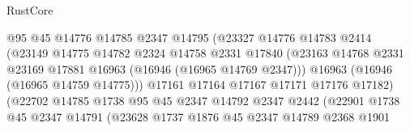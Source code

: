 \begin{lexlean}{RustCore}
\begin{coremodule}
                                      @95
                                      @45
                                      @14776
                                      @14785
                                      @2347
                                      @14795
                                      (@23327
                                        @14776
                                        @14783
                                        @2414
                                        (@23149
                                          @14775
                                          @14782
                                          @2324
                                          @14758
                                          @2331
                                          @17840
                                          (@23163
                                            @14768
                                            @2331
                                            @23169
                                            @17881
                                            @16963
                                            (@16946 (@16965 @14769 @2347)))
                                          @16963
                                          (@16946 (@16965 @14759 @14775)))
                                        @17161
                                        @17164
                                        @17167
                                        @17171
                                        @17176
                                        @17182)
                                      (@22702
                                        @14785
                                        @1738
                                        @95
                                        @45
                                        @2347
                                        @14792
                                        @2347
                                        @2442
                                        (@22901
                                          @1738
                                          @45
                                          @2347
                                          @14791
                                          (@23628
                                            @1737
                                            @1876
                                            @45
                                            @2347
                                            @14789
                                            @2368
                                            @1901

\end{coremodule}
\end{lexlean}
